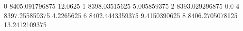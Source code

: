0 8405.091796875 12.0625
1 8398.03515625 5.005859375
2 8393.029296875 0.0
4 8397.255859375 4.2265625
6 8402.4443359375 9.4150390625
8 8406.2705078125 13.2412109375
